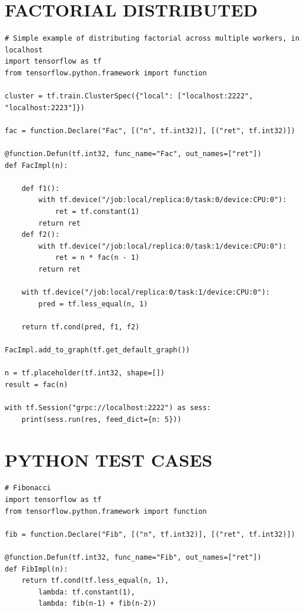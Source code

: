 \documentclass[ack,preface]{dithesis}
\begin{document}
\begin{appendix}
\appendixstartedtrue

{}

\chapter{FACTORIAL DISTRIBUTED}

\begin{lstlisting}
# Simple example of distributing factorial across multiple workers, in localhost
import tensorflow as tf
from tensorflow.python.framework import function

cluster = tf.train.ClusterSpec({"local": ["localhost:2222", "localhost:2223"]})

fac = function.Declare("Fac", [("n", tf.int32)], [("ret", tf.int32)])

@function.Defun(tf.int32, func_name="Fac", out_names=["ret"])
def FacImpl(n):

	def f1(): 
		with tf.device("/job:local/replica:0/task:0/device:CPU:0"):
			ret = tf.constant(1)
		return ret
	def f2(): 
		with tf.device("/job:local/replica:0/task:1/device:CPU:0"):
			ret = n * fac(n - 1)
		return ret

	with tf.device("/job:local/replica:0/task:1/device:CPU:0"):
		pred = tf.less_equal(n, 1)

	return tf.cond(pred, f1, f2)

FacImpl.add_to_graph(tf.get_default_graph())

n = tf.placeholder(tf.int32, shape=[])
result = fac(n)

with tf.Session("grpc://localhost:2222") as sess:
	print(sess.run(res, feed_dict={n: 5}))

\end{lstlisting}
\chapter{PYTHON TEST CASES}

\begin{lstlisting}
# Fibonacci
import tensorflow as tf
from tensorflow.python.framework import function

fib = function.Declare("Fib", [("n", tf.int32)], [("ret", tf.int32)])

@function.Defun(tf.int32, func_name="Fib", out_names=["ret"])
def FibImpl(n):
	return tf.cond(tf.less_equal(n, 1),
		lambda: tf.constant(1),
		lambda: fib(n-1) + fib(n-2))


\end{lstlisting}
\end{appendix}
\end{document}
